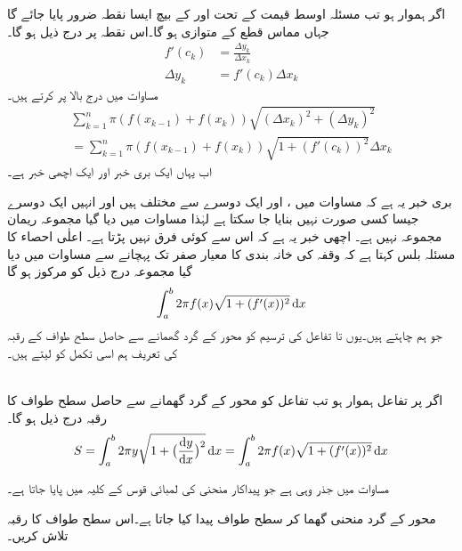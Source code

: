 اگر  ہموار ہو تب مسئلہ اوسط قیمت کے تحت  اور  کے بیچ ایسا نقطہ  ضرور پایا جائے گا جہاں مماس قطع  کے متوازی ہو گا۔اس نقطہ پر درج ذیل ہو گا۔
\begin{align*}
f'(c_k)&=\frac{\Delta y_k}{\Delta x_k}\\
\Delta y_k&=f'(c_k)\Delta x_k
\end{align*} 
مساوات  میں درج بالا  پر کرتے ہیں۔
\begin{multline}\label{مساوات_تکمل_استعمال_سطحی_رقبہ_ب}
\sum_{k=1}^n \pi(f(x_{k-1})+f(x_k))\sqrt{(\Delta x_k)^2+(\Delta y_k)^2}\\
=\sum_{k=1}^n\pi(f(x_{k-1})+f(x_k))\sqrt{1+(f'(c_k))^2}\Delta x_k
\end{multline}
اب یہاں ایک بری خبر اور ایک اچھی خبر ہے۔

بری خبر یہ ہے کہ مساوات  میں  ،  اور  ایک دوسرے سے مختلف ہیں اور انہیں ایک دوسرے جیسا کسی صورت نہیں بنایا جا سکتا ہے لہٰذا مساوات  میں دیا گیا مجموعہ  ریمان مجموعہ نہیں ہے۔ اچھی خبر یہ ہے کہ اس سے کوئی فرق نہیں پڑتا ہے۔ اعلٰی احصاء کا مسئلہ بلس کہتا ہے کہ وقفہ  کی خانہ بندی کا معیار صفر تک پہچانے سے مساوات  میں دیا گیا مجموعہ درج ذیل کو مرکوز ہو گا
\begin{align*}
\int_a^b2\pi f(x)\sqrt{1+(f'(x))^2}\dif x
\end{align*} 
جو ہم چاہتے ہیں۔یوں   تا  تفاعل  کی ترسیم کو  محور کے گرد گھمانے سے حاصل سطح طواف کے رقبہ کی تعریف ہم اسی تکمل کو لیتے ہیں۔

\\
اگر  پر تفاعل  ہموار ہو تب تفاعل  کو  محور کے گرد گھمانے سے حاصل سطح طواف کا رقبہ درج ذیل ہو گا۔
\begin{align}\label{مساوات_تکمل_استعمال_سطحی_رقبہ_پ}                                
S=\int_a^b2\pi y\sqrt{1+\big(\frac{\dif y}{\dif x}\big)^2}\dif x=\int_a^b2\pi f(x)\sqrt{1+(f'(x))^2}\dif x
\end{align}

مساوات  میں جذر وہی ہے جو پیداکار منحنی کی لمبائی قوس کے کلیہ میں پایا جاتا ہے۔

محور  کے گرد منحنی  گھما کر سطح طواف پیدا کیا جاتا ہے۔اس سطح طواف کا رقبہ تلاش کریں۔

